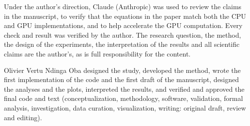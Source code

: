 \documentclass[pdflatex,sn-apa]{sn-jnl}
\begin{document}
 Under the author's direction, Claude (Anthropic) was used to review the claims in
the manuscript, to verify that the equations in the paper match both the CPU and GPU implementations, and to help
accelerate the GPU computation. Every check and result was verified by the author. The research question, the method,
the design of the experiments, the interpretation of the results and all scientific claims are the author's, as is full
responsibility for the content.

 Olivier Vertu Ndinga Oba designed the study, developed the method, wrote the first
implementation of the code and the first draft of the manuscript, designed the analyses and the plots, interpreted the
results, and verified and approved the final code and text (conceptualization, methodology, software, validation,
formal analysis, investigation, data curation, visualization, writing: original draft, review and editing).

\ifdefined\journalversion\else
\clearpage
\begin{appendices}

\end{appendices}
\fi

\clearpage

\end{document}
